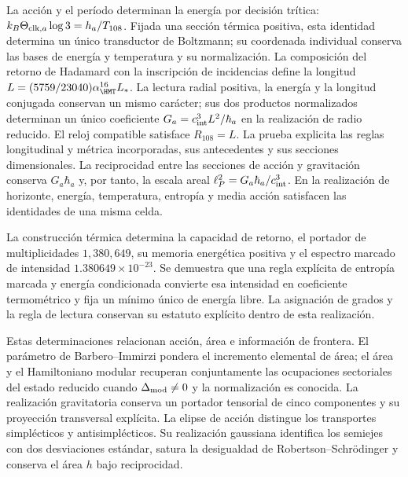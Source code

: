 La acción y el período determinan la energía por decisión trítica:
\(k_B\Theta_{{\rm clk},a}\log3=h_a/T_{108}\).
Fijada una sección térmica positiva, esta identidad determina un único
transductor de Boltzmann; su coordenada individual conserva las bases
de energía y temperatura y su normalización. La composición del retorno
de Hadamard con la inscripción de incidencias define la longitud
\(L=(5759/23040)\alpha_{\HMT}^{16}L_*\). La lectura radial positiva,
la energía y la longitud conjugada conservan un mismo carácter; sus
dos productos normalizados determinan un único coeficiente
\(G_a=c_{\rm int}^3L^2/\hbar_a\) en la realización de radio reducido.
El reloj compatible satisface \(R_{108}=L\). La prueba explicita las
reglas longitudinal y métrica incorporadas, sus antecedentes y sus
secciones dimensionales.
La reciprocidad entre las secciones de acción y gravitación conserva
\(G_a\hbar_a\) y, por tanto, la escala areal
\(\ell_P^2=G_a\hbar_a/c_{\rm int}^3\).
En la realización de horizonte, energía, temperatura, entropía y media
acción satisfacen las identidades de una misma celda.

La construcción térmica determina la capacidad de retorno, el portador de
multiplicidades \(1,380,649\), su memoria energética positiva y el
espectro marcado de intensidad \(1.380649\times10^{-23}\). Se demuestra
que una regla explícita de entropía marcada y energía condicionada
convierte esa intensidad en coeficiente termométrico y fija un mínimo
único de energía libre. La asignación de grados y la regla de lectura
conservan su estatuto explícito dentro de esta realización.

Estas determinaciones relacionan acción, área e información de frontera.
El parámetro de Barbero--Immirzi pondera el incremento elemental de área;
el área y el Hamiltoniano modular recuperan conjuntamente las ocupaciones
sectoriales del estado reducido cuando \(\Delta_{\rm mod}\ne0\) y
la normalización es conocida. La realización gravitatoria conserva un
portador tensorial de cinco componentes y su proyección transversal
explícita. La elipse de acción distingue los transportes simplécticos y
antisimplécticos. Su realización gaussiana identifica los semiejes con dos
desviaciones estándar, satura la desigualdad de Robertson--Schrödinger y
conserva el área \(h\) bajo reciprocidad.

